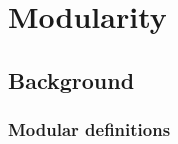 \documentclass[final,twoside]{book}
\begin{document}
\frontmatter





\tableofcontents

\mainmatter






\part{Modularity}

\chapter{Background}

\section{Modular definitions}

\end{document}
